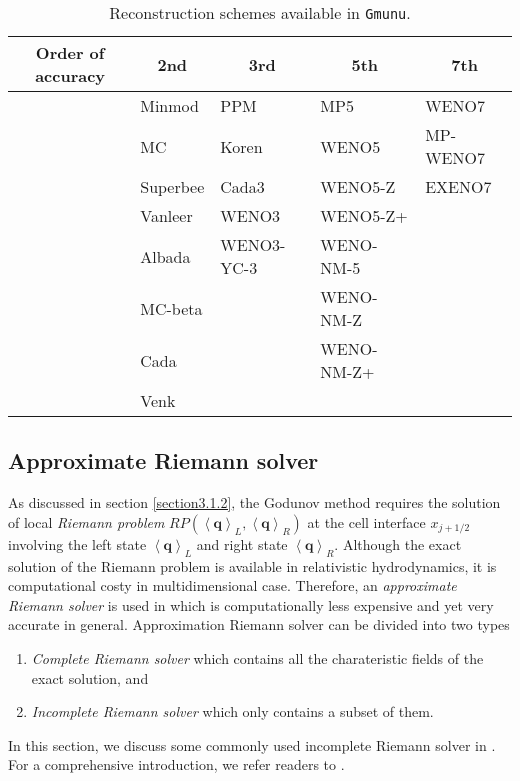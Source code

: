 \begin{table}[h]
	\centering
	\caption{\label{tab:limiters}Reconstruction schemes available in \texttt{Gmunu}.}
	\begin{tabular}{ l | l | l | l | l }
		\multicolumn{1}{c|}{ Order of accuracy } & \multicolumn{1}{c|}{ 2nd } & \multicolumn{1}{c|}{ 3rd } & \multicolumn{1}{c|}{ 5th } & \multicolumn{1}{c}{ 7th }\\ \hline
		  & Minmod \cite{ziegler2011semi,kolgan1972application,van1979towards} 
          & PPM \cite{colella1984piecewise} & MP5 \cite{suresh1997accurate} & WENO7\\
		  & MC \cite{van1974towards} & Koren & WENO5 & MP-WENO7 \\
		  & Superbee \cite{roe1986characteristic} & Cada3 & WENO5-Z & EXENO7 \\
		  & Vanleer \cite{van1977towards} & WENO3 & WENO5-Z+ &  \\
		  & Albada & WENO3-YC-3 & WENO-NM-5 &  \\
		  & MC-beta &  & WENO-NM-Z &  \\
		  & Cada &  & WENO-NM-Z+ &  \\
		  & Venk &  &  &  \\
	\end{tabular}
\end{table}

\subsection{Approximate Riemann solver}
As discussed in section \ref{section3.1.2},
the Godunov method requires the solution of local \textit{Riemann problem }
$RP\left(\left\langle \mathbf{q} \right\rangle_{L}, \left\langle \mathbf{q} \right\rangle_{R} \right)$
at the cell interface $x_{j+1/2}$ involving the left state $\left\langle \mathbf{q} \right\rangle_{L}$
and right state $\left\langle \mathbf{q} \right\rangle_{R}$.
Although the exact solution of the Riemann problem is available in relativistic hydrodynamics,
it is computational costy in multidimensional case.
Therefore, an \textit{approximate Riemann solver} is used in 
which is computationally less expensive and yet very accurate in general.
Approximation Riemann solver can be divided into two types
\begin{enumerate}[label=(\roman*)]
    \item \textit{Complete Riemann solver} which contains all the charateristic fields of the exact solution, and
    \item \textit{Incomplete Riemann solver} which only contains a subset of them.
\end{enumerate}
In this section, we discuss some commonly used incomplete Riemann solver in .
For a comprehensive introduction, we refer readers to \cite{toro2013riemann}.

